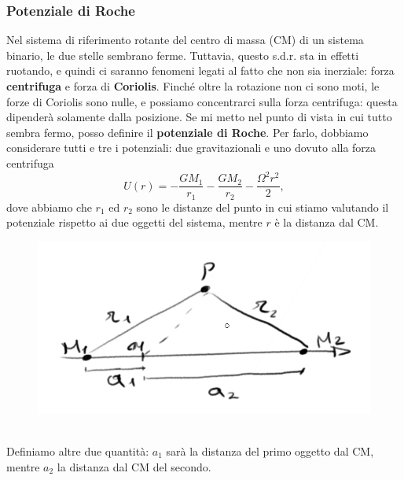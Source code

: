 \subsubsection{Potenziale di Roche}
Nel sistema di riferimento rotante del centro di massa (CM) di un sistema binario, le due stelle sembrano ferme. 
Tuttavia, questo s.d.r. sta in effetti ruotando, e quindi ci saranno fenomeni legati al fatto che non sia inerziale: forza \textbf{centrifuga} e forza di \textbf{Coriolis}.
Finché oltre la rotazione non ci sono moti, le forze di Coriolis sono nulle, e possiamo concentrarci sulla forza centrifuga: questa dipenderà solamente dalla posizione.
Se mi metto nel punto di vista in cui tutto sembra fermo, posso definire il \textbf{potenziale di Roche}.
Per farlo, dobbiamo considerare tutti e tre i potenziali: due gravitazionali e uno dovuto alla forza centrifuga
\begin{equation}
    U(r) = -\frac{GM_1}{r_1} - \frac{GM_2}{r_2} - \frac{\Omega^2r^2}{2},
\end{equation}
dove abbiamo che $r_1$ ed $r_2$ sono le distanze del punto in cui stiamo valutando il potenziale rispetto ai due oggetti del sistema, mentre $r$ è la distanza dal CM.
\begin{figure}[h!]
    \centering
    \includegraphics[width=0.5\linewidth]{Immagini/potensiale di roche su punto.png}
    \label{fig: potenziale di Roche su un punto P}
\end{figure}\\
Definiamo altre due quantità: $a_1$ sarà la distanza del primo oggetto dal CM, mentre $a_2$ la distanza dal CM del secondo.

